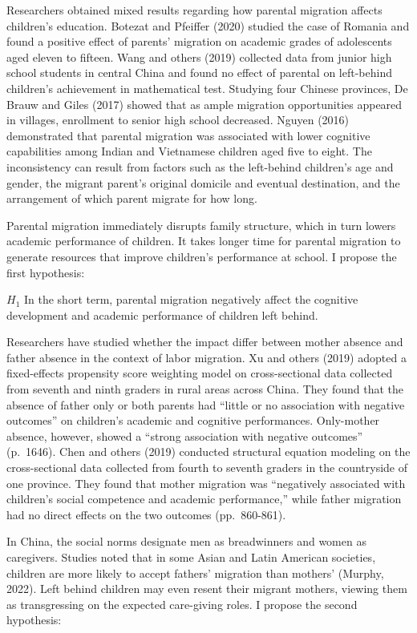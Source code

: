 \documentclass[
  man,floatsintext]{apa7}
\begin{document}
Researchers obtained mixed results regarding how parental migration affects children's education. Botezat and Pfeiffer (2020) studied the case of Romania and found a positive effect of parents' migration on academic grades of adolescents aged eleven to fifteen. Wang and others (2019) collected data from junior high school students in central China and found no effect of parental on left-behind children's achievement in mathematical test. Studying four Chinese provinces, De Brauw and Giles (2017) showed that as ample migration opportunities appeared in villages, enrollment to senior high school decreased. Nguyen (2016) demonstrated that parental migration was associated with lower cognitive capabilities among Indian and Vietnamese children aged five to eight. The inconsistency can result from factors such as the left-behind children's age and gender, the migrant parent's original domicile and eventual destination, and the arrangement of which parent migrate for how long.

Parental migration immediately disrupts family structure, which in turn lowers academic performance of children. It takes longer time for parental migration to generate resources that improve children's performance at school. I propose the first hypothesis:

\(H_1\) In the short term, parental migration negatively affect the cognitive development and academic performance of children left behind.

Researchers have studied whether the impact differ between mother absence and father absence in the context of labor migration. Xu and others (2019) adopted a fixed-effects propensity score weighting model on cross-sectional data collected from seventh and ninth graders in rural areas across China. They found that the absence of father only or both parents had ``little or no association with negative outcomes'' on children's academic and cognitive performances. Only-mother absence, however, showed a ``strong association with negative outcomes'' (p.~1646). Chen and others (2019) conducted structural equation modeling on the cross-sectional data collected from fourth to seventh graders in the countryside of one province. They found that mother migration was ``negatively associated with children's social competence and academic performance,'' while father migration had no direct effects on the two outcomes (pp.~860-861).

In China, the social norms designate men as breadwinners and women as caregivers. Studies noted that in some Asian and Latin American societies, children are more likely to accept fathers' migration than mothers' (Murphy, 2022). Left behind children may even resent their migrant mothers, viewing them as transgressing on the expected care-giving roles. I propose the second hypothesis:
\end{document}
